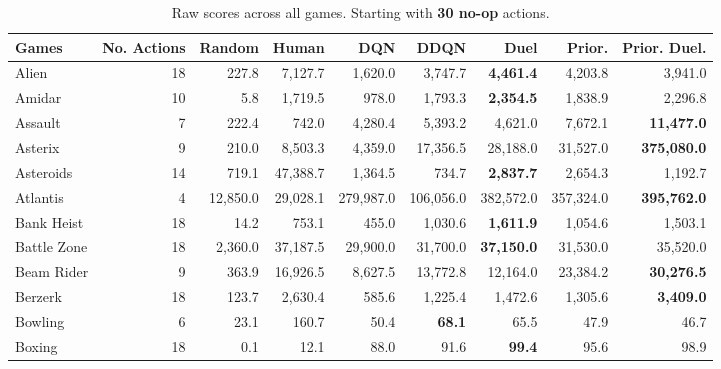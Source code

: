 \label{sec:appen}
\begin{table}[!b]
\footnotesize
\caption{Raw scores across all games. Starting with {\bf 30 no-op} actions.}
\begin{center}
\begin{tabular}{l|rrr|rrr|rr}
{\sc Games} &  {\sc No. Actions} &     {\sc Random} &     {\sc Human} &        {\sc DQN} &       {\sc DDQN} &       {\sc Duel} &{\sc Prior.} & {\sc Prior. Duel.}\\
\hline
               Alien &              18 &      227.8 &   7,127.7 &    1,620.0 &    3,747.7 &{\bf4,461.4}&    4,203.8 &      3,941.0 \\
              Amidar &              10 &        5.8 &   1,719.5 &      978.0 &    1,793.3 &{\bf2,354.5}&    1,838.9 &      2,296.8 \\
             Assault &               7 &      222.4 &     742.0 &    4,280.4 &    5,393.2 &    4,621.0 &    7,672.1 &{\bf11,477.0}\\
             Asterix &               9 &      210.0 &   8,503.3 &    4,359.0 &   17,356.5 &   28,188.0 &   31,527.0 &{\bf375,080.0}\\
           Asteroids &              14 &      719.1 &  47,388.7 &    1,364.5 &      734.7 &{\bf2,837.7}&    2,654.3 &      1,192.7 \\
            Atlantis &               4 &   12,850.0 &  29,028.1 &  279,987.0 &  106,056.0 &  382,572.0 &  357,324.0 &{\bf395,762.0}\\
          Bank Heist &              18 &       14.2 &     753.1 &      455.0 &    1,030.6 &{\bf1,611.9}&    1,054.6 &      1,503.1 \\
         Battle Zone &              18 &    2,360.0 &  37,187.5 &   29,900.0 &   31,700.0 &{\bf37,150.0}&   31,530.0 &     35,520.0 \\
          Beam Rider &               9 &      363.9 &  16,926.5 &    8,627.5 &   13,772.8 &   12,164.0 &   23,384.2 &{\bf30,276.5}\\
             Berzerk &              18 &      123.7 &   2,630.4 &      585.6 &    1,225.4 &    1,472.6 &    1,305.6 &{\bf3,409.0}\\
             Bowling &               6 &       23.1 &     160.7 &       50.4 &{\bf68.1}&       65.5 &       47.9 &         46.7 \\
              Boxing &              18 &        0.1 &      12.1 &       88.0 &       91.6 &{\bf99.4}&       95.6 &         98.9 \\

\end{tabular}
\end{center}
\end{table}
